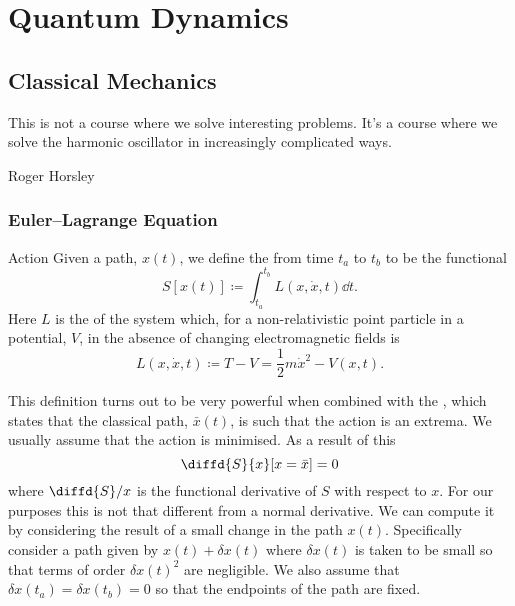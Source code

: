 \documentclass[fleqn]{NotesClass}
\newcommand*{\lagrangian}{L}
\begin{document}
    \part{Quantum Dynamics}
    \chapter{Classical Mechanics}
    \epigraph{This is not a course where we solve interesting problems. It's a course where we solve the harmonic oscillator in increasingly complicated ways.}{Roger Horsley}
    \section{Euler--Lagrange Equation}
    \begin{dfn}{Action}{}
        Given a path, \(x(t)\), we define the  from time \(t_a\) to \(t_b\) to be the functional
        \begin{equation}
            S[x(t)] \coloneqq \int_{t_a}^{t_b} \lagrangian(x, \dot{x}, t) \dd{t}.
        \end{equation}
        Here \(\lagrangian\) is the  of the system which, for a non-relativistic point particle in a potential, \(V\), in the absence of changing electromagnetic fields is
        \begin{equation}
            \lagrangian(x, \dot{x}, t) \coloneqq T - V = \frac{1}{2}m\dot{x}^2 - V(x, t).
        \end{equation}
    \end{dfn}
    
    This definition turns out to be very powerful when combined with the , which states that the classical path, \(\bar{x}(t)\), is such that the action is an extrema.
    We usually assume that the action is minimised.
    As a result of this
    \begin{equation}
        \diffd{S}{x}[x=\bar{x}] = 0
    \end{equation}
    where \(\diffd{S}/{x}\) is the functional derivative of \(S\) with respect to \(x\).
    For our purposes this is not that different from a normal derivative.
    We can compute it by considering the result of a small change in the path \(x(t)\).
    Specifically consider a path given by \(x(t) + \delta x(t)\) where \(\delta x(t)\) is taken to be small so that terms of order \(\delta x(t)^2\) are negligible.
    We also assume that \(\delta x(t_a) = \delta x(t_b) = 0\) so that the endpoints of the path are fixed.
    
\end{document}
